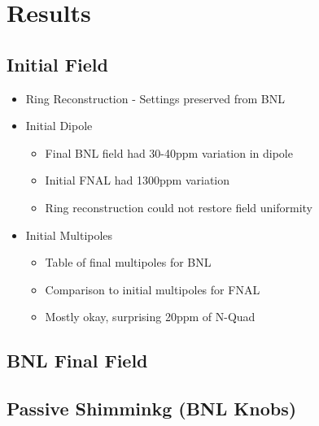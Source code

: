 \section{Results} \label{sec:Results}

\subsection{Initial Field}

\begin{itemize}
  \item Ring Reconstruction - Settings preserved from BNL
  \item Initial Dipole
    \begin{itemize}
      \item Final BNL field had 30-40ppm variation in dipole
      \item Initial FNAL had 1300ppm variation
      \item Ring reconstruction could not restore field uniformity
    \end{itemize}
  \item Initial Multipoles
    \begin{itemize}
      \item Table of final multipoles for BNL
      \item Comparison to initial multipoles for FNAL
      \item Mostly okay, surprising 20ppm of N-Quad
    \end{itemize}
\end{itemize}

\subsection{BNL Final Field}

\subsection{Passive Shimminkg (BNL Knobs)}

